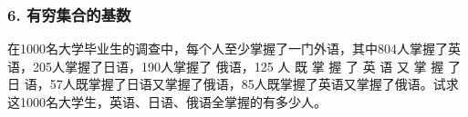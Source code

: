 \documentclass{beamer}
\begin{document}
\begin{CJK*}{UTF8}{gbsn}
\begin{frame}
\frametitle{6. 有穷集合的基数}
\begin{Ex}
  在1000名大学毕业生的调查中，每个人至少掌握了一门外语，其中804人掌握了英语，205人掌握了日语，190人掌握了 俄语，125  人 既 掌 握 了 英 语 又 掌 握 了 日 语，57人既掌握了日语又掌握了俄语，85人既掌握了英语又掌握了俄语。试求这1000名大学生，英语、日语、俄语全掌握的有多少人。
\end{Ex}
\end{frame}

\end{CJK*}
\end{document}
